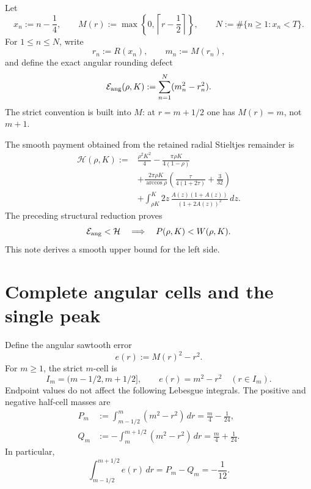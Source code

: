 \documentclass[11pt]{article}
\theoremstyle{remark}
\begin{document}
Let
\begin{equation}
 x_n:=n-\frac14,
 \qquad
 M(r):=\max\left\{0,\left\lceil r-\frac12\right\rceil\right\},
 \qquad
 N:=\#\{n\geq1:x_n<T\}.
 \label{eq:grids}
\end{equation}
For $1\leq n\leq N$, write
\begin{equation}
 r_n:=R(x_n),
 \qquad m_n:=M(r_n),
 \label{eq:rn-mn}
\end{equation}
and define the exact angular rounding defect
\begin{equation}
 \mathcal E_{\rm ang}(\rho,K)
 :=\sum_{n=1}^N(m_n^2-r_n^2).
 \label{eq:Eang}
\end{equation}
The strict convention is built into $M$: at $r=m+1/2$ one has
$M(r)=m$, not $m+1$.

The smooth payment obtained from the retained radial Stieltjes remainder
is
\begin{equation}
 \begin{aligned}
 \mathcal H(\rho,K):={}&
 \frac{\rho^2K^2}{4}
 -\frac{\pi\rho K}{4(1-\rho)}\\
 &+\frac{2\pi\rho K}{\arccos\rho}
   \left(\frac{\tau}{4(1+2\tau)}+\frac3{32}\right)\\
 &+\int_{\rho K}^{K}
 2z\,\frac{A(z)(1+A(z))}{(1+2A(z))^2}\,dz.
 \end{aligned}
 \label{eq:H}
\end{equation}
The preceding structural reduction proves
\begin{equation}
 \mathcal E_{\rm ang}<\mathcal H
 \quad\Longrightarrow\quad
 P(\rho,K)<W(\rho,K).
 \label{eq:structural-implication}
\end{equation}
This note derives a smooth upper bound for the left side.

\section{Complete angular cells and the single peak}

Define the angular sawtooth error
\begin{equation}
 e(r):=M(r)^2-r^2.
 \label{eq:e}
\end{equation}
For $m\geq1$, the strict $m$-cell is
\[
 I_m=(m-1/2,m+1/2],
 \qquad e(r)=m^2-r^2\quad(r\in I_m).
\]
Endpoint values do not affect the following Lebesgue integrals.  The
positive and negative half-cell masses are
\begin{align}
 P_m&:=\int_{m-1/2}^{m}(m^2-r^2)\,dr
     =\frac m4-\frac1{24},
 \label{eq:Pm}\\
 Q_m&:=-\int_m^{m+1/2}(m^2-r^2)\,dr
     =\frac m4+\frac1{24}.
 \label{eq:Qm}
\end{align}
In particular,
\begin{equation}
 \int_{m-1/2}^{m+1/2}e(r)\,dr
 =P_m-Q_m=-\frac1{12}.
 \label{eq:negative-mean}
\end{equation}
\end{document}
